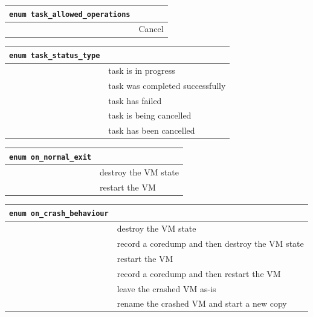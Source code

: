 \vspace{1cm}
\begin{longtable}{|ll|}
\hline
{\tt enum task\_allowed\_operations} & \\
\hline
\hspace{0.5cm}{\tt Cancel} & Cancel \\
\hline
\end{longtable}

\vspace{1cm}
\begin{longtable}{|ll|}
\hline
{\tt enum task\_status\_type} & \\
\hline
\hspace{0.5cm}{\tt pending} & task is in progress \\
\hspace{0.5cm}{\tt success} & task was completed successfully \\
\hspace{0.5cm}{\tt failure} & task has failed \\
\hspace{0.5cm}{\tt cancelling} & task is being cancelled \\
\hspace{0.5cm}{\tt cancelled} & task has been cancelled \\
\hline
\end{longtable}

\vspace{1cm}
\begin{longtable}{|ll|}
\hline
{\tt enum on\_normal\_exit} & \\
\hline
\hspace{0.5cm}{\tt destroy} & destroy the VM state \\
\hspace{0.5cm}{\tt restart} & restart the VM \\
\hline
\end{longtable}

\vspace{1cm}
\begin{longtable}{|ll|}
\hline
{\tt enum on\_crash\_behaviour} & \\
\hline
\hspace{0.5cm}{\tt destroy} & destroy the VM state \\
\hspace{0.5cm}{\tt coredump\_and\_destroy} & record a coredump and then destroy the VM state \\
\hspace{0.5cm}{\tt restart} & restart the VM \\
\hspace{0.5cm}{\tt coredump\_and\_restart} & record a coredump and then restart the VM \\
\hspace{0.5cm}{\tt preserve} & leave the crashed VM as-is \\
\hspace{0.5cm}{\tt rename\_restart} & rename the crashed VM and start a new copy \\
\hline
\end{longtable}


